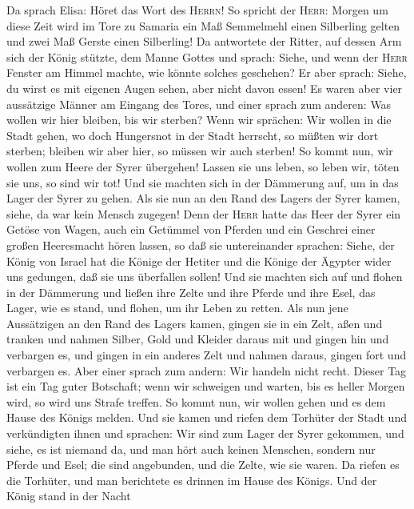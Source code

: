  Da sprach Elisa: Höret das Wort des \textsc{Herrn}! So
spricht der \textsc{Herr}: Morgen um diese Zeit wird im Tore zu Samaria
ein Maß Semmelmehl einen Silberling gelten und zwei Maß Gerste einen
Silberling!  Da antwortete der Ritter, auf dessen Arm sich
der König stützte, dem Manne Gottes und sprach: Siehe, und wenn der
\textsc{Herr} Fenster am Himmel machte, wie könnte solches geschehen? Er
aber sprach: Siehe, du wirst es mit eigenen Augen sehen, aber nicht
davon essen!  Es waren aber vier aussätzige Männer am
Eingang des Tores, und einer sprach zum anderen: Was wollen wir hier
bleiben, bis wir sterben? Wenn wir sprächen: Wir wollen in die Stadt
gehen, wo doch Hungersnot in der Stadt herrscht, so müßten wir dort
sterben; bleiben wir aber hier, so müssen wir auch sterben!
 So kommt nun, wir wollen zum Heere der Syrer übergehen!
Lassen sie uns leben, so leben wir, töten sie uns, so sind wir tot!
 Und sie machten sich in der Dämmerung auf, um in das
Lager der Syrer zu gehen. Als sie nun an den Rand des Lagers der Syrer
kamen, siehe, da war kein Mensch zugegen!  Denn der
\textsc{Herr} hatte das Heer der Syrer ein Getöse von Wagen, auch ein
Getümmel von Pferden und ein Geschrei einer großen Heeresmacht hören
lassen, so daß sie untereinander sprachen: Siehe, der König von Israel
hat die Könige der Hetiter und die Könige der Ägypter wider uns
gedungen, daß sie uns überfallen sollen!  Und sie machten
sich auf und flohen in der Dämmerung und ließen ihre Zelte und ihre
Pferde und ihre Esel, das Lager, wie es stand, und flohen, um ihr Leben
zu retten.  Als nun jene Aussätzigen an den Rand des
Lagers kamen, gingen sie in ein Zelt, aßen und tranken und nahmen
Silber, Gold und Kleider daraus mit und gingen hin und verbargen es, und
gingen in ein anderes Zelt und nahmen daraus, gingen fort und verbargen
es.  Aber einer sprach zum andern: Wir handeln nicht
recht. Dieser Tag ist ein Tag guter Botschaft; wenn wir schweigen und
warten, bis es heller Morgen wird, so wird uns Strafe treffen. So kommt
nun, wir wollen gehen und es dem Hause des Königs melden.
 Und sie kamen und riefen dem Torhüter der Stadt und
verkündigten ihnen und sprachen: Wir sind zum Lager der Syrer gekommen,
und siehe, es ist niemand da, und man hört auch keinen Menschen, sondern
nur Pferde und Esel; die sind angebunden, und die Zelte, wie sie waren.
 Da riefen es die Torhüter, und man berichtete es drinnen
im Hause des Königs.  Und der König stand in der Nacht
